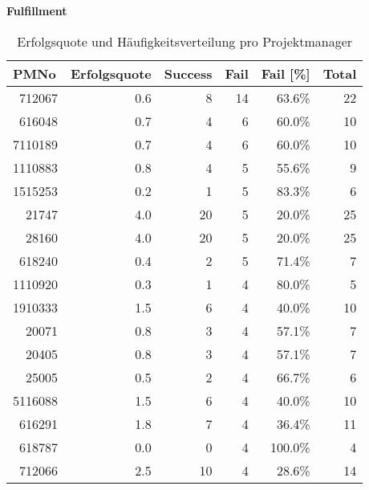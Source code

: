 \textbf{Fulfillment}
\begin{longtable}{lrrrrr}
	\caption{Erfolgsquote und Häufigkeitsverteilung pro Projektmanager}\\
	\textbf{PMNo} & \multicolumn{1}{c}{\textbf{Erfolgsquote}} & {\textbf{Success}} &
	\textbf{Fail} & \textbf{Fail [\%]} & \textbf{Total} \\\hline\endhead
	\multicolumn{1}{r}{712067} & 0.6   & 8     & 14    & 63.6\% & 22 \\
	\multicolumn{1}{r}{616048} & 0.7   & 4     & 6     & 60.0\% & 10 \\
	\multicolumn{1}{r}{7110189} & 0.7   & 4     & 6     & 60.0\% & 10 \\
	\multicolumn{1}{r}{1110883} & 0.8   & 4     & 5     & 55.6\% & 9 \\
	\multicolumn{1}{r}{1515253} & 0.2   & 1     & 5     & 83.3\% & 6 \\
	\multicolumn{1}{r}{21747} & 4.0   & 20    & 5     & 20.0\% & 25 \\
	\multicolumn{1}{r}{28160} & 4.0   & 20    & 5     & 20.0\% & 25 \\
	\multicolumn{1}{r}{618240} & 0.4   & 2     & 5     & 71.4\% & 7 \\
	\multicolumn{1}{r}{1110920} & 0.3   & 1     & 4     & 80.0\% & 5 \\
	\multicolumn{1}{r}{1910333} & 1.5   & 6     & 4     & 40.0\% & 10 \\
	\multicolumn{1}{r}{20071} & 0.8   & 3     & 4     & 57.1\% & 7 \\
	\multicolumn{1}{r}{20405} & 0.8   & 3     & 4     & 57.1\% & 7 \\
	\multicolumn{1}{r}{25005} & 0.5   & 2     & 4     & 66.7\% & 6 \\
	\multicolumn{1}{r}{5116088} & 1.5   & 6     & 4     & 40.0\% & 10 \\
	\multicolumn{1}{r}{616291} & 1.8   & 7     & 4     & 36.4\% & 11 \\
	\multicolumn{1}{r}{618787} & 0.0   & 0     & 4     & 100.0\% & 4 \\
	\multicolumn{1}{r}{712066} & 2.5   & 10    & 4     & 28.6\% & 14 \\

\end{longtable}
